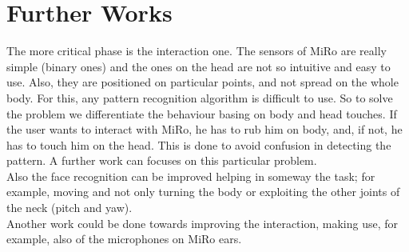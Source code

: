 \documentclass[12pt,peerreviewca, a4paper, onecolumn]{article}
\begin{document}
	\section{Further Works}
	The more critical phase is the interaction one. The sensors of MiRo are really simple (binary ones) and the ones on the head are not so intuitive and easy to use. Also, they are positioned on particular points, and not spread on the whole body. For this, any pattern recognition algorithm is difficult to use. So to solve the problem we differentiate the behaviour basing on body and head touches. If the user wants to interact with MiRo, he has to rub him on body, and, if not, he has to touch him on the head. This is done to avoid confusion in detecting the pattern. A further work can focuses on this particular problem.\\
	Also the face recognition can be improved helping in someway the task; for example, moving and not only turning the body or exploiting the other joints of the neck (pitch and yaw).\\
	Another work could be done towards improving the interaction, making use, for example, also of the microphones on MiRo ears.
 
	 
		

	
\end{document}

